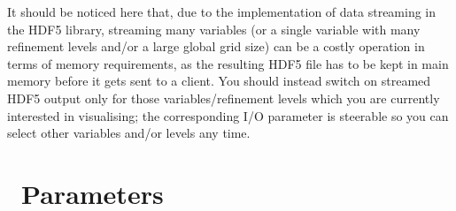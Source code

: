 \documentclass{article}
\begin{document}
It should be noticed here that, due to the implementation of data streaming
in the HDF5 library, streaming many variables (or a single variable with many
refinement levels and/or a large global grid size) can be a costly
operation in terms of memory requirements, as the resulting HDF5 file has
to be kept in main memory before it gets sent to a client. You should instead
switch on streamed HDF5 output only for those variables/refinement levels
which you are currently interested in visualising; the corresponding
I/O parameter is steerable so you can select other variables and/or levels
any time.


\section{\ThisThorn\ Parameters}
\end{document}

